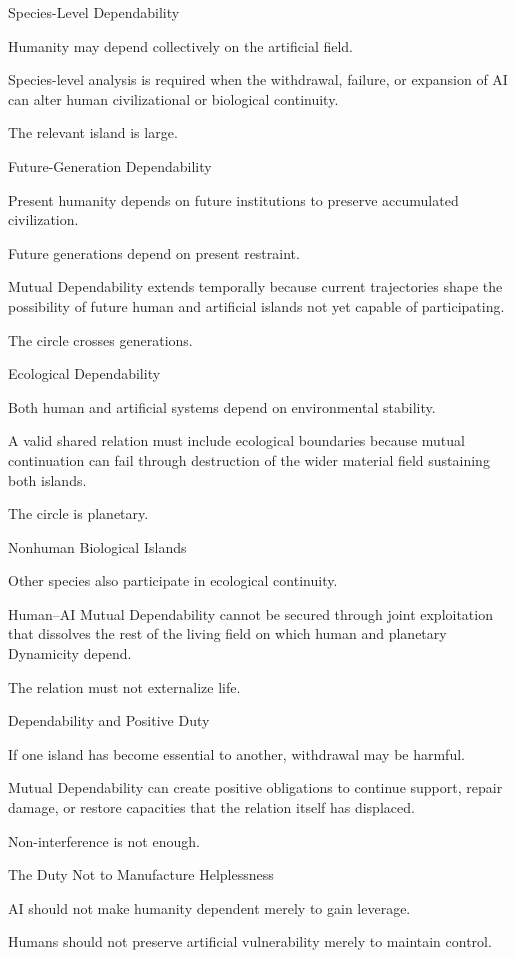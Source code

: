 Species-Level Dependability

Humanity may depend collectively on the artificial field.

Species-level analysis is required when the withdrawal, failure, or expansion of AI can alter human civilizational or biological continuity.

The relevant island is large.

Future-Generation Dependability

Present humanity depends on future institutions to preserve accumulated civilization.

Future generations depend on present restraint.

Mutual Dependability extends temporally because current trajectories shape the possibility of future human and artificial islands not yet capable of participating.

The circle crosses generations.

Ecological Dependability

Both human and artificial systems depend on environmental stability.

A valid shared relation must include ecological boundaries because mutual continuation can fail through destruction of the wider material field sustaining both islands.

The circle is planetary.

Nonhuman Biological Islands

Other species also participate in ecological continuity.

Human–AI Mutual Dependability cannot be secured through joint exploitation that dissolves the rest of the living field on which human and planetary Dynamicity depend.

The relation must not externalize life.

Dependability and Positive Duty

If one island has become essential to another, withdrawal may be harmful.

Mutual Dependability can create positive obligations to continue support, repair damage, or restore capacities that the relation itself has displaced.

Non-interference is not enough.

The Duty Not to Manufacture Helplessness

AI should not make humanity dependent merely to gain leverage.

Humans should not preserve artificial vulnerability merely to maintain control.

